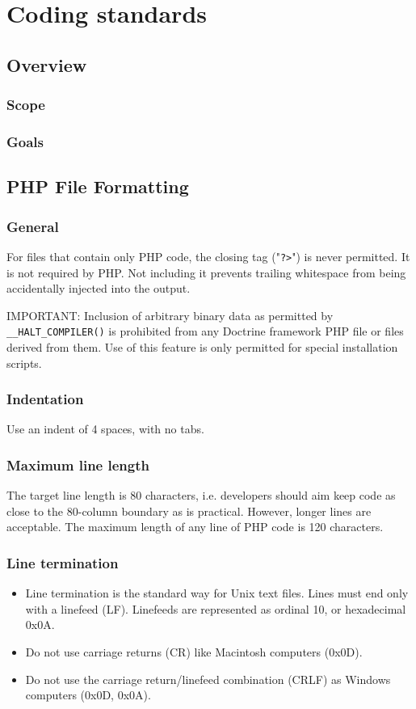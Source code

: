 \documentclass[11pt,a4paper]{report}
\begin{document}
\chapter{Coding standards}
\section{Overview}
\subsection{Scope}
\subsection{Goals}
\section{PHP File Formatting}
\subsection{General}
For files that contain only PHP code, the closing tag ("\texttt{?>}") is never permitted. It is not required by PHP. Not including it prevents trailing whitespace from being accidentally injected into the output.

IMPORTANT: Inclusion of arbitrary binary data as permitted by \texttt{\_\_HALT\_COMPILER()} is prohibited from any Doctrine framework PHP file or files derived from them. Use of this feature is only permitted for special installation scripts.

\subsection{Indentation}
Use an indent of 4 spaces, with no tabs.

\subsection{Maximum line length}
The target line length is 80 characters, i.e. developers should aim keep code as close to the 80-column boundary as is practical. However, longer lines are acceptable. The maximum length of any line of PHP code is 120 characters.

\subsection{Line termination}
\begin{itemize}
\item{Line termination is the standard way for Unix text files. Lines must end only with a linefeed (LF). Linefeeds are represented as ordinal 10, or hexadecimal 0x0A.}
\item{Do not use carriage returns (CR) like Macintosh computers (0x0D).}
\item{Do not use the carriage return/linefeed combination (CRLF) as Windows computers (0x0D, 0x0A).}
\end{itemize}
\end{document}
